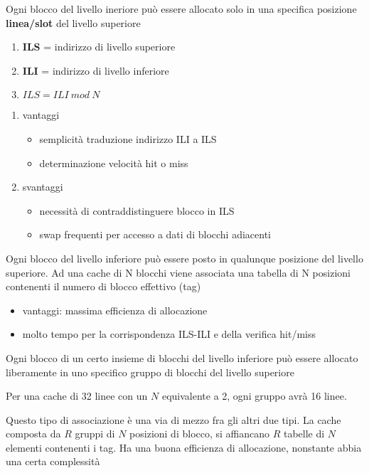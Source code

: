 \documentclass[12pt, a4paper]{article}
\begin{document}
\begin{defn} 
Ogni blocco del livello ineriore può essere allocato solo in una specifica posizione  \textbf{linea/slot} del livello superiore
\begin{enumerate}
	\item \textbf{ILS} = indirizzo di livello superiore
	\item \textbf{ILI} = indirizzo di livello inferiore 
	\item $ILS = ILI\ mod\ N$
\end{enumerate}	

\begin{enumerate}
	\item vantaggi
		\begin{itemize}
			\item semplicità traduzione indirizzo ILI a ILS
			\item determinazione velocità hit o miss
		\end{itemize}
	\item svantaggi
		\begin{itemize}
			\item necessità di contraddistinguere blocco in ILS
			\item swap frequenti per accesso a dati di blocchi adiacenti		    \end{itemize}
\end{enumerate}
\end{defn}

\begin{defn} 
Ogni blocco del livello inferiore può essere posto in qualunque posizione del livello superiore. \newline
Ad una cache di N blocchi viene associata una tabella di N posizioni contenenti il numero di blocco effettivo (tag)
\begin{itemize}
	\item vantaggi: massima efficienza di allocazione
	\item molto tempo per la corrispondenza ILS-ILI e della verifica hit/miss
\end{itemize}
\end{defn}

\begin{defn} 
Ogni blocco di un certo insieme di blocchi del livello inferiore può essere allocato liberamente in uno specifico gruppo di blocchi del livello superiore

\begin{esem}
Per una cache di 32 linee con un $N$ equivalente a 2, ogni gruppo avrà 16 linee.
\end{esem}
Questo tipo di associazione è una via di mezzo fra gli altri due tipi. 
La cache composta da $R$ gruppi di $N$ posizioni di blocco, si affiancano $R$ tabelle di $N$ elementi contenenti i tag.
Ha una buona efficienza di allocazione, nonstante abbia una certa complessità
\end{defn}
\end{document}
